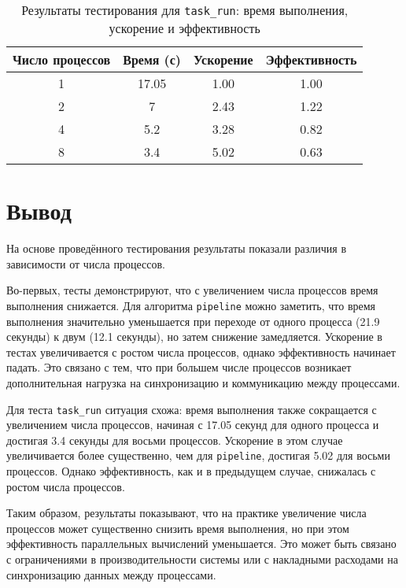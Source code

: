 \documentclass[a4paper,14pt]{extarticle}
\begin{document}
\begin{table}[t] %
\centering
\setlength{\tabcolsep}{3pt} 
\small
\begin{tabular}{|c|c|c|c|}  
\hline
\textbf{Число процессов} & \textbf{Время (с)} & \textbf{Ускорение} & \textbf{Эффективность } \\ \hline
1 & 17.05 & 1.00 & 1.00 \\ \hline
2 & 7 & 2.43 & 1.22 \\ \hline
4 & 5.2 & 3.28 & 0.82 \\ \hline
8 & 3.4 & 5.02 & 0.63 \\ \hline
\end{tabular}
\caption{Результаты тестирования для \texttt{task\_run}: время выполнения, ускорение и эффективность}
\end{table}

\clearpage

\section*{Вывод}

На основе проведённого тестирования результаты показали различия в зависимости от числа процессов.

Во-первых, тесты демонстрируют, что с увеличением числа процессов время выполнения снижается. Для алгоритма \texttt{pipeline} можно заметить, что время выполнения значительно уменьшается при переходе от одного процесса (21.9 секунды) к двум (12.1 секунды), но затем снижение замедляется.  Ускорение в тестах увеличивается с ростом числа процессов, однако эффективность начинает падать. Это связано с тем, что при большем числе процессов возникает дополнительная нагрузка на синхронизацию и коммуникацию между процессами.

Для теста \texttt{task\_run} ситуация схожа: время выполнения также сокращается с увеличением числа процессов, начиная с 17.05 секунд для одного процесса и достигая 3.4 секунды для восьми процессов. Ускорение в этом случае увеличивается более существенно, чем для \texttt{pipeline}, достигая 5.02 для восьми процессов. Однако эффективность, как и в предыдущем случае, снижалась с ростом числа процессов.

Таким образом, результаты показывают, что на практике увеличение числа процессов может существенно снизить время выполнения, но при этом эффективность параллельных вычислений уменьшается. Это может быть связано с ограничениями в производительности системы или с накладными расходами на синхронизацию данных между процессами. 
\end{document}
